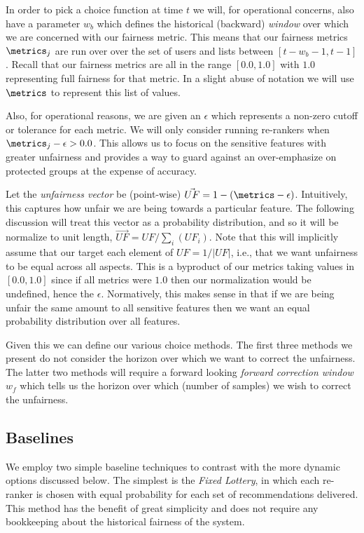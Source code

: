In order to pick a choice function at time $t$ we will, for operational concerns, also have a parameter $w_b$ which defines the historical (backward) \emph{window} over which we are concerned with our fairness metric.  This means that our fairness metrics $\metrics_j$ are run over over the set of users and lists between $[t - w_b - 1, t-1]$.  Recall that our fairness metrics are all in the range $[0.0, 1.0]$ with $1.0$ representing full fairness for that metric.  In a slight abuse of notation we will use $\metrics$ to represent this list of values.

Also, for operational reasons, we are given an $\epsilon$ which represents a non-zero cutoff or tolerance for each metric.  We will only consider running re-rankers when $\metrics_j - \epsilon > 0.0$. This allows us to focus on the sensitive features with greater unfairness and provides a way to guard against an over-emphasize on protected groups at the expense of accuracy.

Let the \emph{unfairness vector} be (point-wise) $\vec{UF} = 1 - (\metrics - \epsilon)$.  Intuitively, this captures how unfair we are being towards a particular feature.  The following discussion will treat this vector as a probability distribution, and so it will be normalize to unit length, $\vec{UF} = UF / \sum_i(UF_i)$.  Note that this will implicitly assume that our target each element of $UF = 1/|UF|$, i.e., that we want unfairness to be equal across all aspects.  This is a byproduct of our metrics taking values in $[0.0,1.0]$ since if all metrics were $1.0$ then our normalization would be undefined, hence the $\epsilon$.  Normatively, this makes sense in that if we are being unfair the same amount to all sensitive features then we want an equal probability distribution over all features.

Given this we can define our various choice methods. The first three methods we present do not consider the horizon over which we want to correct the unfairness.  The latter two methods will require a forward looking \emph{forward correction window} $w_f$ which tells us the horizon over which (number of samples) we wish to correct the unfairness.

\subsection{Baselines}\label{sec:static}
We employ two simple baseline techniques to contrast with the more dynamic options discussed below. The simplest is the \textit{Fixed Lottery}, in which each re-ranker is chosen with equal probability for each set of recommendations delivered. This method has the benefit of great simplicity and does not require any bookkeeping about the historical fairness of the system. 

